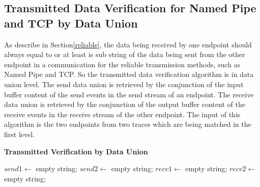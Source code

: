 \subsection{Transmitted Data Verification for Named Pipe and TCP by Data Union}
As describe in Section\ref{reliable}, the data being received by one endpoint should always equal to or at least is sub string of the data being sent from the other endpoint in a communication for the reliable transmission methods, such as Named Pipe and TCP. So the transmitted data verification algorithm is in data union level. The send data union is retrieved by the conjunction of the input buffer content of the send events in the send stream of an endpoint. The receive data union is retrieved by the conjunction of the output buffer content of the receive events in the receive stream of the other endpoint. The input of this algorithm is the two endpoints from two traces which are being matched in the first level.
\begin{algorithm}[H]
\DontPrintSemicolon
\caption{{\bf Transmitted Verification by Data Union} \label{dataAlg1}}
$send1 \leftarrow$ empty string;\;
$send2 \leftarrow$ empty string;\;
$recv1 \leftarrow$ empty string;\;
$recv2 \leftarrow$ empty string;\;

\end{algorithm} 

